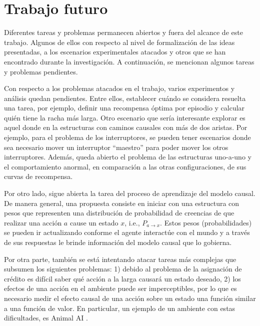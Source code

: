 \section{Trabajo futuro}

Diferentes tareas y problemas permanecen abiertos y fuera del alcance de este trabajo. Algunos de ellos con respecto al nivel de formalización de las ideas presentadas, a los escenarios experimentales atacados  y otros que se han encontrado durante la investigación. A continuación, se 
mencionan algunos tareas y problemas pendientes.

Con respecto a los problemas atacados en el trabajo,
varios experimentos y análisis quedan pendientes. Entre ellos, 
establecer cuándo se considera resuelta una tarea, por ejemplo, 
definir una recompensa óptima por episodio y 
calcular quién tiene la racha más larga.  Otro escenario que sería interesante
explorar es aquel donde en la estructuras con caminos causales con más de dos aristas. Por ejemplo, para el problema de los interruptores, se pueden
tener escenarios donde sea necesario mover un interruptor ``maestro'' para
poder mover los otros interruptores. Además, queda abierto el problema
de las estructuras uno-a-uno y el comportamiento anormal, en comparación
a las otras configuraciones, de sus curvas de recompensa.

Por otro lado, sigue abierta la tarea del proceso de aprendizaje del modelo
causal. De manera general, una propuesta consiste en iniciar con una estructura con pesos que representen 
una distribución de probabilidad de creencias de que realizar una acción $a$ cause un estado $x$, i.e., $P_{a\rightarrow x}$. Estos pesos (probabilidades) se pueden
ir actualizando conforme el agente interactúe con el mundo y
a través de sus respuestas le brinde información del modelo causal que lo gobierna.

Por otra parte, también se está intentando atacar tareas más 
complejas que subsumen los siguientes problemas: 1) debido al problema de la asignación de crédito es difícil saber qué acción a la larga causará un estado deseado, 2) los efectos de una acción en el ambiente puede ser imperceptibles, por lo que es necesario medir el efecto causal de una acción sobre un estado una función similar a una función de valor. En particular, un ejemplo de un ambiente con estas dificultades, es Animal AI \cite{beyret2019animalai}.


